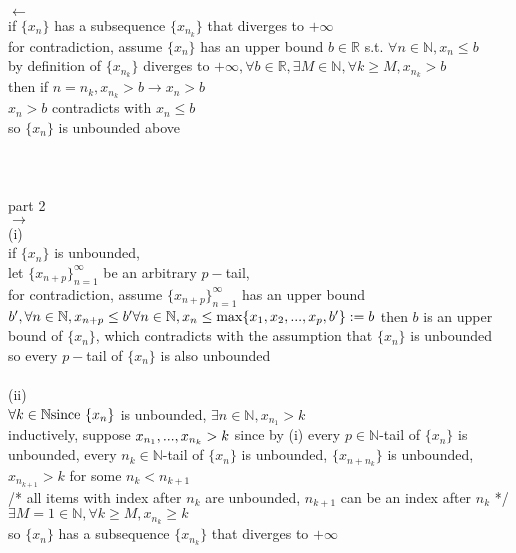 \documentclass[12pt, border = 4pt, multi]{article} %
\begin{document}
$\leftarrow$\\
if $\{x_n\}$ has a subsequence $\{x_{n_k}\}$ that diverges to $+\infty$\\
for contradiction, assume $\{x_n\}$ has an upper bound $b \in \mathbb{R}$ s.t. $\forall n \in \mathbb{N}, x_n \leq b$\\
by definition of $\{x_{n_k}\}$ diverges to $+\infty, \forall b \in \mathbb{R}, \exists M \in \mathbb{N}, \forall k \geq M, x_{n_k} > b$\\
then if $n = n_k, x_{n_k} > b \rightarrow x_n > b$\\
$x_n > b$ contradicts with $x_n \leq b$\\
so $\{x_n\}$ is unbounded above\\
\\
\\
\\
part 2\\
$\rightarrow$\\
(i)\\
if $\{x_n\}$ is unbounded,\\
let $\{x_{n + p}\}_{n = 1} ^ {\infty}$ be an arbitrary $p-$tail,\\
for contradiction, assume $\{x_{n + p}\}_{n = 1} ^ {\infty}$ has an upper bound $b', \forall n \in \mathbb{N}, x_{n + p} \leq b'\\
\forall n \in \mathbb{N}, x_n \leq \max\{x_1, x_2, ..., x_p, b'\} := b\\$
then $b$ is an upper bound of $\{x_n\}$, which contradicts with the assumption that $\{x_n\}$ is unbounded\\
so every $p-$tail of $\{x_n\}$ is also unbounded\\
\\
(ii)\\
$\forall k \in \mathbb{N}\\
\text{since }\{x_n\}$ is unbounded, $\exists n \in \mathbb{N}, x_{n_1} > k$\\
inductively, suppose $x_{n_1}, ..., x_{n_k} > k\\$
since by (i) every $p \in \mathbb{N}$-tail of $\{x_n\}$ is unbounded, every $n_k \in \mathbb{N}$-tail of $\{x_n\}$ is unbounded, $\{x_{n + n_k}\}$ is unbounded, $x_{n_{k + 1}} > k$ for some $n_k < n_{k + 1}$\\
/* all items with index after $n_k$ are unbounded, $n_{k + 1}$ can be an index after $n_k$ */\\
$\exists M = 1 \in \mathbb{N}, \forall k \geq M, x_{n_k} \geq k$\\
so $\{x_n\}$ has a subsequence $\{x_{n_k}\}$ that diverges to $+\infty$\\
\end{document}
